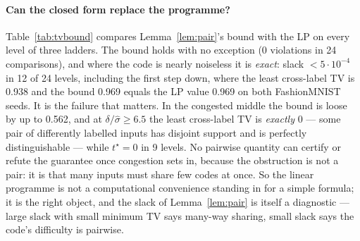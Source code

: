 \documentclass[11pt]{article}
\begin{document}
\paragraph{Can the closed form replace the programme?} Table~\ref{tab:tvbound} compares
Lemma~\ref{lem:pair}'s bound with the LP on every level of three ladders. The bound holds with no
exception (0 violations in 24
comparisons), and where the code is nearly noiseless it is \emph{exact}: slack $<5\cdot10^{-4}$ in
12 of 24 levels, including the first step down, where the least
cross-label TV is 0.938 and the bound 0.969 equals the LP value 0.969 on both FashionMNIST seeds.
It is the failure that matters. In the congested middle the bound is loose by up to
0.562, and at $\delta/\hat\sigma\ge6.5$ the least cross-label TV is
\emph{exactly} $0$ --- some pair of differently labelled inputs has disjoint support and is
perfectly distinguishable --- while $t^\star=0$ in 9 levels. No pairwise quantity can
certify or refute the guarantee once congestion sets in, because the obstruction is not a pair: it
is that many inputs must share few codes at once. So the linear programme is not a computational
convenience standing in for a simple formula; it is the right object, and the slack of
Lemma~\ref{lem:pair} is itself a diagnostic --- large slack with small minimum TV says
many-way sharing, small slack says the code's difficulty is pairwise.

\begin{table}[t]\centering\footnotesize
\setlength{\tabcolsep}{3pt}
\caption{Pair bound (Lemma~\ref{lem:pair}) versus the LP guarantee on three trained codes at
$\beta=10^{-2}$, per lattice step. ``TV'' is the least total variation between two differently
labelled inputs' discretised latent distributions; ``bound'' is $\tfrac12(1+\mathrm{TV})$.}
\label{tab:tvbound}
\resizebox{\textwidth}{!}{}
\end{table}
\end{document}
